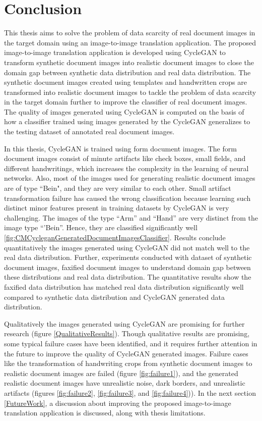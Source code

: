 \section{Conclusion}\label{Conclusion}

This thesis aims to solve the problem of data scarcity of real document images in the target domain using an image-to-image translation application. The proposed image-to-image translation application is developed using \ac{CycleGAN} to transform synthetic document images into realistic document images to close the domain gap between synthetic data distribution and real data distribution. The synthetic document images created using templates and handwritten crops are transformed into realistic document images to tackle the problem of data scarcity in the target domain further to improve the classifier of real document images. The quality of images generated using \ac{CycleGAN} is computed on the basis of how a classifier trained using images generated by the \ac{CycleGAN} generalizes to the testing dataset of annotated real document images. 


In this thesis, \ac{CycleGAN} is trained using form document images. The form document images consist of minute artifacts like check boxes, small fields, and different handwritings, which increases the complexity in the learning of neural networks. Also, most of the images used for generating realistic document images are of type ``Bein", and they are very similar to each other. Small artifact transformation failure has caused the wrong classification because learning such distinct minor features present in training datasets by \ac{CycleGAN} is very challenging. The images of the type ``Arm'' and ``Hand'' are very distinct from the image type ``'Bein''. Hence, they are classified significantly well \ref{fig:CMCycleganGeneratedDocumentImagesClassifier}. Results conclude quantitatively the images generated using \ac{CycleGAN} did not match well to the real data distribution. Further, experiments conducted with dataset of synthetic document images, faxified document images to understand domain gap between these distributions and real data distribution. The quantitative results show the faxified data distribution has matched real data distribution significantly well compared to synthetic data distribution and \ac{CycleGAN} generated data distribution. 


Qualitatively the images generated using \ac{CycleGAN} are promising for further research (figure \ref{QualitativeResults}). Though qualitative results are promising, some typical failure cases have been identified, and it requires further attention in the future to improve the quality of \ac{CycleGAN} generated images. Failure cases like the transformation of handwriting crops from synthetic document images to realistic document images are failed (figure \ref{fig:failure1}), and the generated realistic document images have unrealistic noise, dark borders, and unrealistic artifacts (figures \ref{fig:failure2}, \ref{fig:failure3}, and \ref{fig:failure4})). In the next section \ref{FutureWork}, a discussion about improving the proposed image-to-image translation application is discussed, along with thesis limitations.

